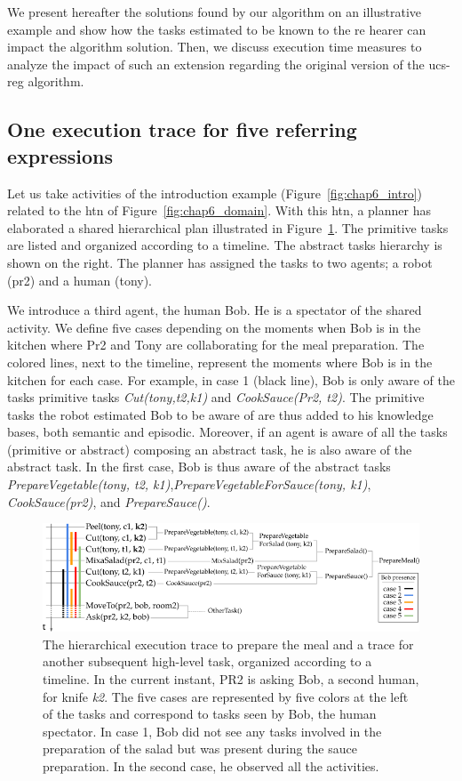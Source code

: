 We present hereafter the solutions found by our algorithm on an illustrative example and show how the tasks estimated to be known to the \acrshort{re} hearer can impact the algorithm solution. Then, we discuss execution time measures to analyze the impact of such an extension regarding the original version of the \acrshort{ucs}-\acrshort{reg} algorithm.

\subsection{One execution trace for five referring expressions}

Let us take activities of the introduction example (Figure~\ref{fig:chap6_intro}) related to the \acrshort{htn} of Figure~\ref{fig:chap6_domain}. With this \acrshort{htn}, a planner has elaborated a shared hierarchical plan illustrated in Figure~\ref{fig:chap6_meal_plan}. The primitive tasks are listed and organized according to a timeline. The abstract tasks hierarchy is shown on the right. The planner has assigned the tasks to two agents; a robot (pr2) and a human (tony).

We introduce a third agent, the human Bob. He is a spectator of the shared activity. We define five cases depending on the moments when Bob is in the kitchen where Pr2 and Tony are collaborating for the meal preparation. The colored lines, next to the timeline, represent the moments where Bob is in the kitchen for each case. For example, in case 1 (black line), Bob is only aware of the tasks primitive tasks \textit{Cut(tony,t2,k1)} and \textit{CookSauce(Pr2, t2)}. The primitive tasks the robot estimated Bob to be aware of are thus added to his knowledge bases, both semantic and episodic. Moreover, if an agent is aware of all the tasks (primitive or abstract) composing an abstract task, he is also aware of the abstract task. In the first case, Bob is thus aware of the abstract tasks \textit{PrepareVegetable(tony, t2, k1)},\textit{PrepareVegetableForSauce(tony, k1)}, \textit{CookSauce(pr2)}, and \textit{PrepareSauce()}.

\begin{figure}[ht!]
\centering
\includegraphics[width=\textwidth]{figures/chapter6/prepare_meal_plan.png}
\caption{\label{fig:chap6_meal_plan} The hierarchical execution trace to prepare the meal and a trace for another subsequent high-level task, organized according to a timeline. In the current instant, PR2 is asking Bob, a second human, for knife \textit{k2}. The five cases are represented by five colors at the left of the tasks and correspond to tasks seen by Bob, the human spectator. In case 1, Bob did not see any tasks involved in the preparation of the salad but was present during the sauce preparation. In the second case, he observed all the activities.}
\end{figure}


